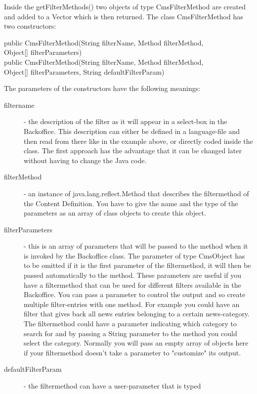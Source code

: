 Inside the {\meth getFilterMethods()} two objects of type {\class CmsFilterMethod}
are created and added to a Vector which is then returned. The class
{\class CmsFilterMethod} has two constructors:

\begin{java}
\jtaba public CmsFilterMethod(String filterName, Method filterMethod,\\
\jtabc    Object[] filterParameters)\\[1ex]
\jtaba public CmsFilterMethod(String filterName, Method filterMethod,\\
\jtabc    Object[] filterParameters, String defaultFilterParam)
\end{java}

The parameters of the constructors have the following meanings:\\
\begin{description}
\item[filtername] - the description of the filter as it will appear
in a select-box in the Backoffice. This description can either be defined
in a language-file and then read from there like in the example above, or 
directly coded inside the class. The first approach has the advantage that
it can be changed later without having to change the Java code.
\item[filterMethod] - an instance of {\class java.lang.reflect.Method}
that describes the filtermethod of the Content Definition. You have to give
the name and the type of the parameters as an array of class objects to create
this object.
\item[filterParameters] - this is an array of parameters that will be passed
to the method when it is invoked by the Backoffice class. The parameter of type 
{\class CmsObject} has to be omitted if it is the first parameter of the filtermethod,
it will then be passed automatically to the method. These parameters are useful if you have
a filtermethod that can be used for different filters available in the Backoffice. You can
pass a parameter to control the output and so create multiple filter-entries with one method.
For example you could have an filter that gives back all news entries belonging to a certain
news-category. The filtermethod could have a parameter indicating which category to search for
and by passing a String parameter to the method you could select the category. Normally
you will pass an empty array of objects here if your filtermethod doesn't take a parameter
to "customize" its output.
\item[defaultFilterParam] - the filtermethod can have a user-parameter that is typed 

\end{description}
